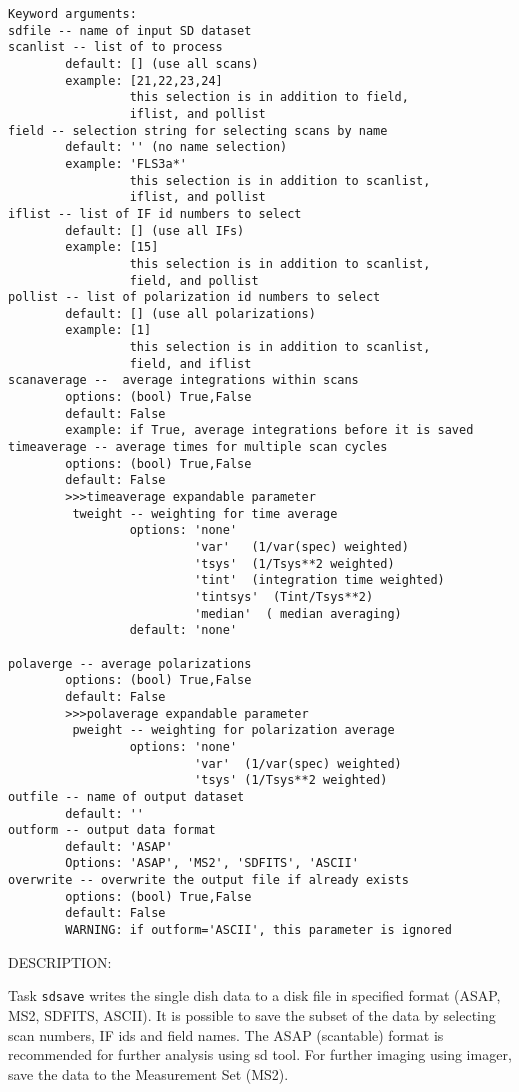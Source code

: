 \begin{verbatim}
Keyword arguments:
sdfile -- name of input SD dataset
scanlist -- list of to process
        default: [] (use all scans)
        example: [21,22,23,24]
                 this selection is in addition to field,
                 iflist, and pollist
field -- selection string for selecting scans by name
        default: '' (no name selection)
        example: 'FLS3a*'
                 this selection is in addition to scanlist,
                 iflist, and pollist
iflist -- list of IF id numbers to select
        default: [] (use all IFs)
        example: [15]
                 this selection is in addition to scanlist,
                 field, and pollist
pollist -- list of polarization id numbers to select
        default: [] (use all polarizations)
        example: [1]
                 this selection is in addition to scanlist,
                 field, and iflist
scanaverage --  average integrations within scans
        options: (bool) True,False
        default: False
        example: if True, average integrations before it is saved
timeaverage -- average times for multiple scan cycles
        options: (bool) True,False
        default: False
        >>>timeaverage expandable parameter
         tweight -- weighting for time average
                 options: 'none'
                          'var'   (1/var(spec) weighted)
                          'tsys'  (1/Tsys**2 weighted)
                          'tint'  (integration time weighted)
                          'tintsys'  (Tint/Tsys**2)
                          'median'  ( median averaging)
                 default: 'none'

polaverge -- average polarizations
        options: (bool) True,False
        default: False
        >>>polaverage expandable parameter
         pweight -- weighting for polarization average
                 options: 'none'
                          'var'  (1/var(spec) weighted)
                          'tsys' (1/Tsys**2 weighted)
outfile -- name of output dataset
        default: ''
outform -- output data format
        default: 'ASAP'
        Options: 'ASAP', 'MS2', 'SDFITS', 'ASCII'
overwrite -- overwrite the output file if already exists
        options: (bool) True,False
        default: False
        WARNING: if outform='ASCII', this parameter is ignored
\end{verbatim}

          DESCRIPTION:

          Task {\tt sdsave} writes the single dish data to a disk file in 
          specified format (ASAP, MS2, SDFITS, ASCII). It is possible to
          save the subset of the data by selecting scan numbers, IF ids
          and field names. The ASAP (scantable) format is recommended for
          further analysis using sd tool. For further imaging using imager,
          save the data to the Measurement Set (MS2).

